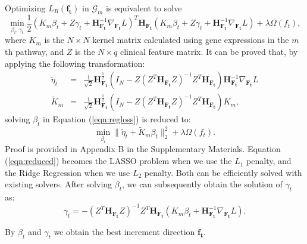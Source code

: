 \documentclass[a4paper,12pt]{article}
\newcommand{\bd}[1]{\mathbf{#1}}
\newcommand{\grad}[2]{\nabla_{\bd{#2}} #1}
\newcommand{\hess}[1]{\bd{H}_{\bd{#1}}}
\begin{document}
Optimizing $L_R(\bd{f_t})$ in $\mathcal{G}_m$ is equivalent to solve
\begin{equation}
\label{eqn:regloss}
\min_{\beta_t, \gamma_t} \frac{1}{2} (K_m \beta_t + Z \gamma_t + \hess{F_t}^{-1} \grad{L}{F_t})^T \hess{F_t} (K_m \beta_t + Z \gamma_t + \hess{F_t}^{-1} \grad{L}{F_t}) + \lambda \Omega({f_t}),
\end{equation}
where $K_m$ is the $N \times N$ kernel matrix calculated using gene expressions in the $m$th pathway, and $Z$ is the $N \times q$ clinical feature matrix. It can be proved that, by applying the following transformation:
\begin{eqnarray*}
	\tilde{\eta}_t &=& \frac{1}{\sqrt{2}}\hess{F_t}^{\frac{1}{2}}(I_N - Z(Z^T \hess{F_t} Z)^{-1}Z^T \hess{F_t})\hess{F_t}^{-1}\grad{L}{F_t}\\
	\tilde{K}_m &=& \frac{1}{\sqrt{2}}\hess{F_t}^{\frac{1}{2}}(I_N - Z(Z^T\hess{F_t}Z)^{-1}Z^T\hess{F_t})K_m,
\end{eqnarray*}
solving $\beta_t$ in Equation (\ref{eqn:regloss}) is reduced to:
\begin{equation}
\label{eqn:reduced}
\min_{\beta_t} \|\tilde{\eta}_t + \tilde{K}_m \beta_t \|_2^2 + \lambda \Omega({f_t}).
\end{equation}
Proof is provided in Appendix B in the Supplementary Materials. Equation (\ref{eqn:reduced}) becomes the LASSO problem when we use the $L_1$ penalty, and the Ridge Regression when we use $L_2$ penalty. Both can be efficiently solved with existing solvers. After solving $\beta_t$, we can subsequently obtain the solution of $\gamma_t$ as:
$$\gamma_t = -(Z^T\hess{F_t}Z)^{-1}Z^T\hess{F_t}(K_m\beta_t + \hess{F_t}^{-1}\grad{L}{F_t}).$$

By $\beta_t$ and $\gamma_t$ we obtain the best increment direction $\bd{f_t}$.
\end{document}
